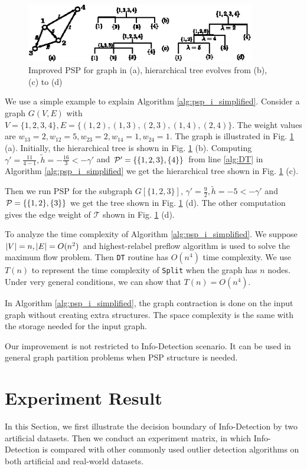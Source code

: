 \documentclass[runningheads]{llncs}
\begin{document}
\begin{figure}[!ht]
	\centering
	\includegraphics[width=10cm]{pic/alg_illustration.eps}
	\caption{Improved PSP for graph in (a), hierarchical tree evolves from (b), (c) to (d) }\label{fig:alg_eg}
\end{figure}

\begin{example}
	We use a simple example to explain Algorithm \ref{alg:psp_i_simplified}. Consider a graph $G(V, E)$ with $V=\{1,2,3,4\}, E=\{(1,2),(1,3),(2,3),(1,4),(2,4)\}$. The weight values are $w_{13}=2, w_{12}=5, w_{23}=2, w_{14}=1, w_{24}=1$. The graph is illustrated
	in Fig. \ref{fig:alg_eg} (a). Initially, the hierarchical tree is shown in Fig. \ref{fig:alg_eg} (b). Computing $\gamma' = \frac{11}{4-1}, \tilde{h} = -\frac{16}{3} < -\gamma' $ and $\P' = \{\{1,2,3\},\{4\}\}$ from line \ref {alg:DT} in Algorithm \ref{alg:psp_i_simplified} we get the hierarchical tree shown in Fig. \ref{fig:alg_eg} (c).
	
	Then we run PSP for the subgraph $G[\{1,2,3\}]$, $\gamma' = \frac{9}{2}, \tilde{h} = -5 < -\gamma'$ and $\P= \{\{1,2\},\{3\}\}$ we get the tree shown in Fig. \ref{fig:alg_eg} (d). The other computation gives the edge weight of $\mathcal{T}$ shown in Fig. \ref{fig:alg_eg} (d).
\end{example}		

To analyze the time complexity of Algorithm \ref{alg:psp_i_simplified}. We suppose $\abs{V} = n, \abs{E} = O(n^2)$ and highest-relabel preflow algorithm is used to solve the maximum flow problem. Then \texttt{DT} routine has $O(n^4)$ time complexity. 
We use $T(n)$ to represent the time complexity of \texttt{Split} when the graph has $n$ nodes. Under very general conditions, we can show that $T(n) = O(n^4)$. 

In Algorithm \ref{alg:psp_i_simplified}, the graph contraction is done on the input graph without creating extra structures. The space complexity is the same with the storage needed for the input graph. 

Our improvement is not restricted to Info-Detection scenario. It can be used in general graph partition problems when PSP structure is needed.

\section{Experiment Result}\label{sec:Experiemt}
In this Section, we first illustrate the decision boundary of Info-Detection by two artificial datasets. Then we conduct an experiment matrix, in which Info-Detection is compared with other commonly used outlier detection algorithms on both artificial and real-world datasets.
\end{document}
